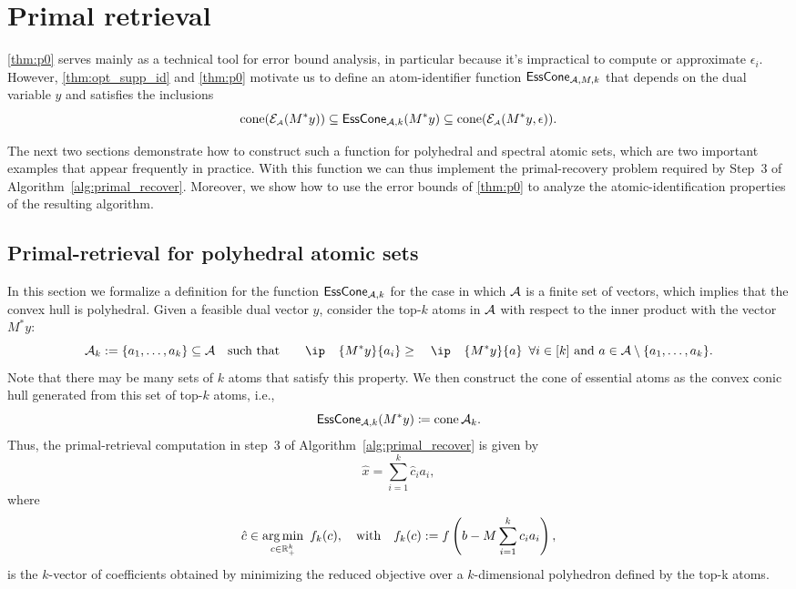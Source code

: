\section{Primal retrieval} \label{sec:primal-retrieval}

\autoref{thm:p0} serves mainly as a technical tool for error bound analysis, in particular because it's impractical to compute or approximate $\epsilon_i$. However, \autoref{thm:opt_supp_id} and \autoref{thm:p0} motivate us to define an atom-identifier function $\operatorname{\sf EssCone}_{\mathcal{A}, M, k}$ that depends on the dual variable $y$ and satisfies the inclusions 
\[\operatorname{cone}(\mathcal{E}_{\scriptscriptstyle\mathcal{A}}(M^*y)) \subseteq \operatorname{\sf EssCone}_{\mathcal{A}, k}(M^*y) \subseteq \operatorname{cone}(\mathcal{E}_{\scriptscriptstyle\mathcal{A}}(M^*y, \epsilon)).\]

The next two sections demonstrate how to construct such a function for polyhedral and spectral atomic sets, which are two important examples that appear frequently in practice. With this function we can thus implement the primal-recovery problem required by Step~3 of Algorithm~\ref{alg:primal_recover}. Moreover, we show how to use the error bounds of \autoref{thm:p0} to analyze the atomic-identification properties of the resulting algorithm.


\subsection{Primal-retrieval for polyhedral atomic sets} \label{sec:polyhedral}

In this section we formalize a definition for the function $\operatorname{\sf EssCone}_{\mathcal{A}, k}$ for the case in which $\mathcal{A}$ is a finite set of vectors, which implies that the convex hull is  polyhedral. Given a feasible dual vector $y$, consider the top-$k$ atoms in $\mathcal{A}$ with respect to the inner product with the vector $M^*y$:
\begin{equation} \label{eq:top-k}
    \Ascr_k := \{a_1, \dots, a_k\} \subseteq \Ascr \text{such that} \ip{M^*y}{a_i} \geq \ip{M^*y}{a} \enspace\forall i \in [k] ~\mbox{and}~ a \in \Ascr\setminus\{a_1, \dots, a_k\}.
\end{equation}
Note that there may be many sets of $k$ atoms that satisfy this property. We then construct the cone of essential atoms as the convex conic hull generated from this set of top-$k$ atoms, i.e.,
\begin{equation}\label{eq-essential-cone-poly}
  \operatorname{\sf EssCone}_{\mathcal{A}, k}(M^*y) \coloneqq \operatorname{cone}\mathcal{A}_k.
\end{equation}
Thus, the primal-retrieval computation in step~3 of Algorithm~\ref{alg:primal_recover} is given by 
\begin{equation*}
\hat x = \sum_{i=1}^k \hat c_ia_i, 
\end{equation*}
where
\begin{equation} \label{eq-top-k-recover}
  \hat c \in \underset{c \in \mathbb{R}^k_+}{\textrm{arg}\,{\min}}\enskip f_k(c),
  \hbox{\quad with\quad} f_k(c) := f\left( b - M\sum_{i=1}^k c_ia_i \right),
\end{equation}
is the $k$-vector of coefficients obtained by minimizing the reduced objective over a $k$-dimensional polyhedron defined by the top-k atoms.

